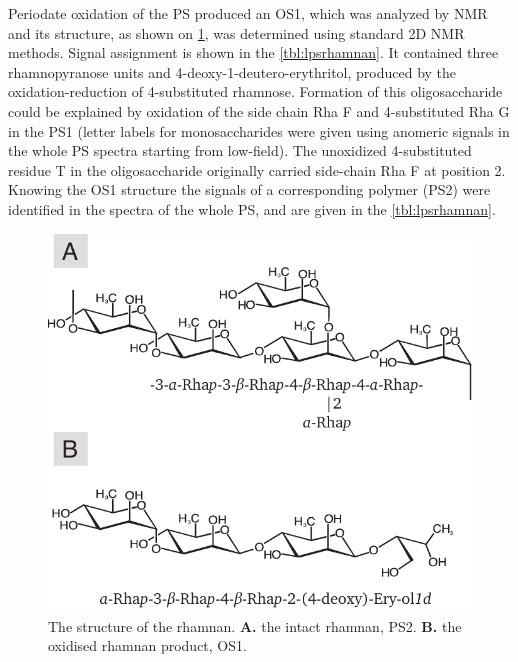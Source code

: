 		Periodate oxidation of the \ac{PS} produced an \ac{OS}1, which was analyzed by \ac{NMR} and its structure, as shown on \cref{fig:lpsrhamnan}, was determined using standard 2D \ac{NMR} methods. Signal assignment is shown in the \cref{tbl:lpsrhamnan}. It contained three rhamnopyranose units and 4-deoxy-1-deutero-erythritol, produced by the oxidation-reduction of 4-substituted rhamnose. Formation of this oligosaccharide could be explained by oxidation of the side chain Rha F and 4-substituted Rha G in the \ac{PS}1 (letter labels for monosaccharides were given using anomeric signals in the whole \ac{PS} spectra starting from low-field). The unoxidized 4-substituted residue T in the oligosaccharide originally carried side-chain Rha F at position 2. Knowing the \ac{OS}1 structure the signals of a corresponding polymer (\ac{PS}2) were identified in the spectra of the whole \ac{PS}, and are given in the \cref{tbl:lpsrhamnan}. 

		\begin{figure}[htb]
			\begin{center}
				\includegraphics[]{lps_chapter/img/lpsrhamnan.pdf}
			\end{center}
			\caption[The structure of the \caulobacter rhamnan.]{The structure of the \caulobacter rhamnan. \textbf{A.} the intact rhamnan, \ac{PS}2. \textbf{B.} the oxidised rhamnan product, \ac{OS}1.}
			\label{fig:lpsrhamnan}
		\end{figure}

